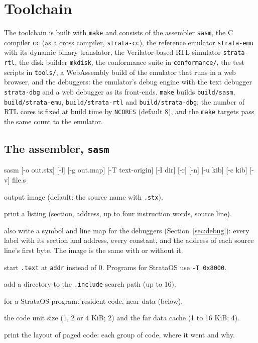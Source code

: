 \chapter{Toolchain}\label{ch:toolchain}

The toolchain is built with \texttt{make} and consists of the assembler \texttt{sasm}, the C compiler
\texttt{cc} (as a cross compiler, \texttt{strata-cc}), the reference
emulator \texttt{strata-emu} with its dynamic binary translator, the Verilator-based RTL simulator
\texttt{strata-rtl}, the disk builder \texttt{mkdisk}, the conformance suite in \texttt{conformance/},
the test scripts in \texttt{tools/}, a WebAssembly build of the emulator that runs in a web browser,
and the debuggers: the emulator's debug engine with the text debugger \texttt{strata-dbg} and a web
debugger as its front-ends. \texttt{make} builds \texttt{build/sasm}, \texttt{build/strata-emu},
\texttt{build/strata-rtl} and \texttt{build/strata-dbg}; the
number of RTL cores is fixed at build time by \texttt{NCORES} (default 8), and the \texttt{make} targets
pass the same count to the emulator.

\section{The assembler, \texttt{sasm}}

\begin{shell}
sasm [-o out.stx] [-l] [-g out.map] [-T text-origin] [-I dir] [-r] [-n] [-u kib] [-c kib] [-v] file.s
\end{shell}

\begin{description}[leftmargin=1em,style=nextline]
\item[\texttt{-o}] output image (default: the source name with \texttt{.stx}).
\item[\texttt{-l}] print a listing (section, address, up to four instruction words, source line).
\item[\texttt{-g file}] also write a symbol and line map for the debuggers (Section~\ref{sec:debug}):
  every label with its section and address, every constant, and the address of each source line's
  first byte. The image is the same with or without it.
\item[\texttt{-T addr}] start \texttt{.text} at \texttt{addr} instead of 0. Programs for StrataOS use
  \texttt{-T 0x8000}.
\item[\texttt{-I dir}] add a directory to the \texttt{.include} search path (up to 16).
\item[\texttt{-r}, \texttt{-n}] for a StrataOS program: resident code, near data (below).
\item[\texttt{-u kib}, \texttt{-c kib}] the code unit size (1, 2 or 4 KiB; 2) and the far data cache
  (1 to 16 KiB; 4).
\item[\texttt{-v}] print the layout of paged code: each group of code, where it went and why.
\end{description}

